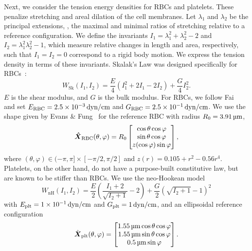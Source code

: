 Next, we consider the tension energy densities for RBCs and platelets. These penalize stretching and areal
dilation of the cell membranes. Let $\lambda_1$ and $\lambda_2$ be the principal extensions, , the
maximal and minimal ratios of stretching relative to a reference configuration. We define the invariants
$I_1=\lambda_1^2+\lambda_2^2-2$ and $I_2 = \lambda_1^2\lambda_2^2-1$, which measure relative changes in length and
area, respectively, such that $I_1 = I_2 = 0$ correspond to a rigid body motion. We express the tension density in
terms of these invariants. Skalak's Law was designed specifically for RBCs~\cite{Skalak:1973tp}:
\begin{equation}\label{eq:skalak-law}
    W_\text{Sk}(I_1, I_2) = \frac{E}4\left(I_1^2 + 2I_1 - 2I_2\right) + \frac{G}4 I_2^2.
\end{equation}
$E$ is the shear modulus, and $G$ is the bulk modulus. For RBCs, we follow Fai ~\cite{Fai:2013do} and set $\rbc{E} = 2.5\sci{-3}\dynpercm$ and $\rbc{G} = 2.5\sci{-1}\dynpercm$. We use
the shape given by Evans \& Fung~\cite{Evans:1972uf} for the reference RBC with radius $R_0 = 3.91\um$,
\begin{equation}
    {\boldsymbol{\hat{X}}}_\text{RBC}(\theta, \varphi) = R_0\begin{bmatrix}
            \cos\theta\cos\varphi \\
            \sin\theta\cos\varphi \\
            z(\cos\varphi)\sin\varphi
    \end{bmatrix},
\end{equation}
where $(\theta, \varphi)\in(-\pi, \pi]\times[-\pi/2, \pi/2]$ and $z(r) = 0.105 + r^2 - 0.56r^4$. Platelets, on the
other hand, do not have a purpose-built constitutive law, but are known to be stiffer than RBCs. We use the neo-Hookean model
\begin{equation}\label{eq:neohookean}
    W_\text{nH}(I_1, I_2) = \frac{E}2\left(\frac{I_1+2}{\sqrt{I_2+1}}-2\right) + \frac{G}2 {\left(\sqrt{I_2+1}-1\right)}^2
\end{equation}
with $\plt{E} = 1\sci{-1}\dynpercm$ and $\plt{G} = 1\dynpercm$, and an ellipsoidal reference configuration~%
\cite{Frojmovic:1982wk}
\begin{equation}
    \plt{\hat{\vec{X}}}(\theta, \varphi) = \begin{bmatrix}
            1.55\um\cos\theta\cos\varphi \\
            1.55\um\sin\theta\cos\varphi \\
            0.5\um\sin\varphi
    \end{bmatrix}.
\end{equation}

